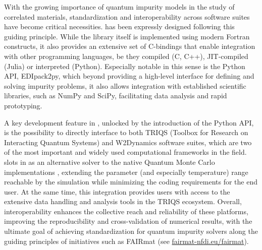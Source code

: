 \documentclass[edipack_sp.tex]{subfiles}
\begin{document}
With the growing importance of quantum impurity models in the study of correlated materials, standardization and interoperability across software suites have become critical necessities.
\NAME has been expressly designed following this guiding principle. 
While the library itself is implemented using modern Fortran constructs, it also provides an extensive set of C-bindings that enable integration with other programming languages,
be they compiled (C, C++), JIT-compiled (Julia) or interpreted (Python).  
Especially notable in this sense is the Python API, EDIpack2py, which beyond providing a 
high-level interface for defining and solving impurity problems, it also allows integration with established scientific libraries, such as NumPy and SciPy, facilitating data analysis and
rapid prototyping. 

A key development feature in \NAME, unlocked by the introduction of the Python API, 
is the possibility to directly interface to both TRIQS \cite{Parcollet2015CPC} (Toolbox for Research on Interacting Quantum Systems) and
W2Dynamics \cite{Wallerberger2019CPC} software suites, which are two of the most important and widely used computational frameworks in the field.
\NAME slots in as an alternative solver to the native Quantum Monte Carlo 
implementations \cite{Gull2011RMP,Seth2016CPC}, extending the parameter (and especially temperature) range reachable by 
the simulation while minimizing the coding requirements for the end user.
At the same time, this integration provides \NAME users with access to the
extensive data handling and analysis tools in the TRIQS ecosystem. 
Overall, interoperability enhances the collective reach and reliability of these platforms, 
improving the reproducibility and cross-validation of numerical results, with the ultimate goal of achieving standardization for quantum impurity solvers along the guiding principles of initiatives such as FAIRmat (see \href{https://www.fairmat-nfdi.eu/fairmat/}{fairmat-nfdi.eu/fairmat}). 
\end{document}

